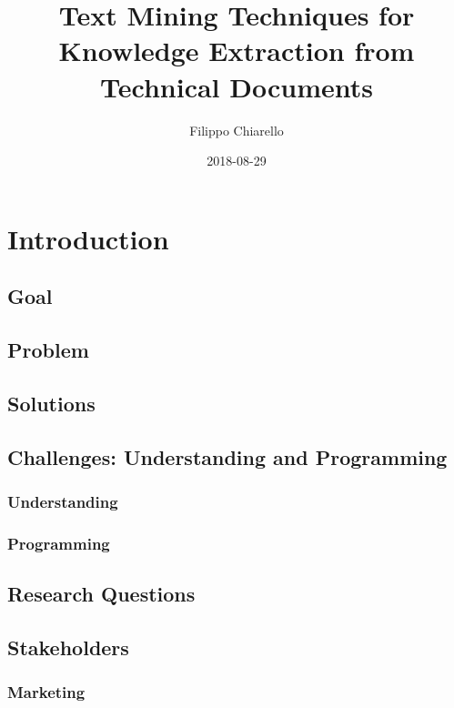 \documentclass[]{book}
\title{Text Mining Techniques for Knowledge Extraction from Technical Documents}
\author{Filippo Chiarello}
\date{2018-08-29}
\begin{document}
\maketitle

{
\setcounter{tocdepth}{1}
\tableofcontents
}
\chapter{Introduction}\label{intro}

\section{Goal}\label{goal}

\section{Problem}\label{problem}

\section{Solutions}\label{solutions}

\section{Challenges: Understanding and
Programming}\label{challenges-understanding-and-programming}

\subsection{Understanding}\label{understanding}

\subsection{Programming}\label{programming}

\section{Research Questions}\label{research-questions}

\section{Stakeholders}\label{stakeholders}

\subsection{Marketing}\label{marketing}
\end{document}
